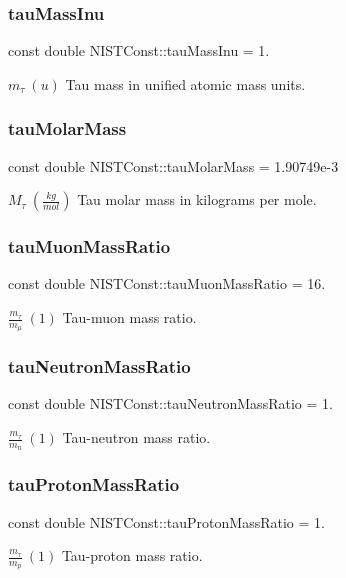 \subsubsection{\texorpdfstring{tau\+Mass\+Inu}{tauMassInu}}
{\footnotesize\ttfamily const double N\+I\+S\+T\+Const\+::tau\+Mass\+Inu = 1.}

$m_\tau \ (u)$ Tau mass in unified atomic mass units. \mbox{\label{group___n_i_s_t_const-_tau_ga07e317845454c4534cc0273efa2e55c6}} 
\subsubsection{\texorpdfstring{tau\+Molar\+Mass}{tauMolarMass}}
{\footnotesize\ttfamily const double N\+I\+S\+T\+Const\+::tau\+Molar\+Mass = 1.\+90749e-\/3}

$M_\tau \ (\frac{kg}{mol})$ Tau molar mass in kilograms per mole. \mbox{\label{group___n_i_s_t_const-_tau_gac648100c94ae427f98a87390a9263379}} 
\subsubsection{\texorpdfstring{tau\+Muon\+Mass\+Ratio}{tauMuonMassRatio}}
{\footnotesize\ttfamily const double N\+I\+S\+T\+Const\+::tau\+Muon\+Mass\+Ratio = 16.}

$\frac{m_\tau}{m_\mu} \ (1)$ Tau-\/muon mass ratio. \mbox{\label{group___n_i_s_t_const-_tau_ga024557c365e76b225bef98f0a0a9283b}} 
\subsubsection{\texorpdfstring{tau\+Neutron\+Mass\+Ratio}{tauNeutronMassRatio}}
{\footnotesize\ttfamily const double N\+I\+S\+T\+Const\+::tau\+Neutron\+Mass\+Ratio = 1.}

$\frac{m_\tau}{m_n} \ (1)$ Tau-\/neutron mass ratio. \mbox{\label{group___n_i_s_t_const-_tau_ga07236b2b11bdbfaee49e581a44bb01e8}} 
\subsubsection{\texorpdfstring{tau\+Proton\+Mass\+Ratio}{tauProtonMassRatio}}
{\footnotesize\ttfamily const double N\+I\+S\+T\+Const\+::tau\+Proton\+Mass\+Ratio = 1.}

$\frac{m_\tau}{m_p} \ (1)$ Tau-\/proton mass ratio. 